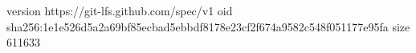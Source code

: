 version https://git-lfs.github.com/spec/v1
oid sha256:1e1e526d5a2a69bf85ecbad5ebbdf8178e23cf2f674a9582c548f051177e95fa
size 611633
